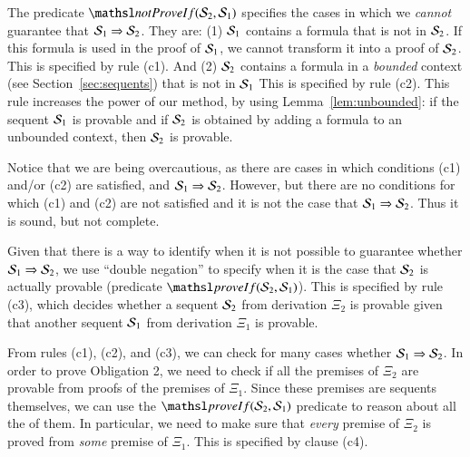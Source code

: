 \documentclass{new_tlp}
\newcommand{\provIf}[2]{\ensuremath{\tsl{proveIf}(\ensuremath{#1},\ensuremath{#2})}}
\newcommand{\notProvIf}[2]{\ensuremath{\tsl{notProveIf}(\ensuremath{#1},\ensuremath{#2})}}
\begin{document}
The predicate $\notProvIf{\Sscr_2}{\Sscr_1}$ specifies the cases in which we
\emph{cannot} guarantee that $\Sscr_1 \Rightarrow \Sscr_2$.
They are: (1) $\Sscr_1$ contains a formula that is not in $\Sscr_2$. If this
formula is used in the proof of $\Sscr_1$, we cannot transform it into a proof
of $\Sscr_2$. This is specified by rule (c1). And (2) $\Sscr_2$ contains a
formula in a \emph{bounded} context (see Section~\ref{sec:sequents}) that is not in $\Sscr_1$
This is specified by rule (c2). 
This rule increases the power of our
method, by using Lemma~\ref{lem:unbounded}:
if the sequent $\Sscr_1$ is provable and if $\Sscr_2$ is obtained
by adding a formula to an unbounded context, 
then $\Sscr_2$ is provable. 

Notice that we are being overcautious, as there 
are cases in which conditions (c1) and/or (c2) are satisfied, and $\Sscr_1 \Rightarrow \Sscr_2$. 
However, but there are no conditions for which (c1) and (c2) are not satisfied and 
it is not the case that $\Sscr_1 \Rightarrow \Sscr_2$. Thus it is sound, but not complete.


Given that there is a way to identify when it is not possible to guarantee whether 
$\Sscr_1 \Rightarrow \Sscr_2$, we use ``double negation'' to specify
when it is the case that $\Sscr_2$ is actually provable (predicate
$\provIf{\Sscr_2}{\Sscr_1}$). This is specified by rule (c3), which decides
whether a sequent $\Sscr_2$ from derivation $\Xi_2$ is provable given that another
sequent $\Sscr_1$ from derivation $\Xi_1$ is provable.

From rules (c1), (c2), and (c3),  we can check for many cases whether $\Sscr_1 \Rightarrow \Sscr_2$.
In order to prove
Obligation 2, we need to check if all the premises of $\Xi_2$ are provable from
proofs of the premises of $\Xi_1$. Since these premises are sequents
themselves, we can use the $\provIf{\Sscr_2}{\Sscr_1}$ predicate to reason
about all the of them. In particular, we need to make sure that \emph{every} premise of
$\Xi_2$ is proved from \emph{some} premise of $\Xi_1$. This is specified by clause
(c4).
\end{document}
